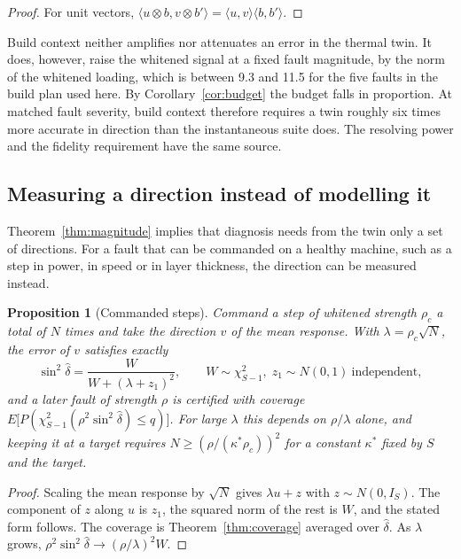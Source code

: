 \documentclass[preprint,12pt]{elsarticle}
\newtheorem{proposition}[theorem]{Proposition}
\begin{document}
\begin{proof}
For unit vectors,
$\langle u\otimes b, v\otimes b'\rangle = \langle u,v\rangle\langle b,b'\rangle$.
\end{proof}

Build context neither amplifies nor attenuates an error in the thermal twin.
It does, however, raise the whitened signal at a fixed fault magnitude, by the
norm of the whitened loading, which is between 9.3 and 11.5 for the five faults
in the build plan used here. By Corollary~\ref{cor:budget} the budget falls in
proportion. At matched fault severity, build context therefore requires a twin
roughly six times more accurate in direction than the instantaneous suite does.
The resolving power and the fidelity requirement have the same source.

\subsection{Measuring a direction instead of modelling it}

Theorem~\ref{thm:magnitude} implies that diagnosis needs from the twin only a
set of directions. For a fault that can be commanded on a healthy machine, such
as a step in power, in speed or in layer thickness, the direction can be
measured instead.

\begin{proposition}[Commanded steps]
\label{prop:commanded}
Command a step of whitened strength $\rho_c$ a total of $N$ times and take the
direction $v$ of the mean response. With $\lambda = \rho_c\sqrt{N}$, the error
of $v$ satisfies exactly
\begin{equation}
\sin^2\hat\delta = \frac{W}{W + (\lambda + z_1)^2},
\qquad W\sim\chi^2_{S-1},\; z_1 \sim N(0,1)\ \text{independent},
\end{equation}
and a later fault of strength $\rho$ is certified with coverage
$E\bigl[P(\chi^2_{S-1}(\rho^2\sin^2\hat\delta)\le q)\bigr]$. For large
$\lambda$ this depends on $\rho/\lambda$ alone, and keeping it at a target
requires $N \ge (\rho/(\kappa^*\rho_c))^2$ for a constant $\kappa^*$ fixed by
$S$ and the target.
\end{proposition}

\begin{proof}
Scaling the mean response by $\sqrt N$ gives $\lambda u + z$ with
$z \sim N(0, I_S)$. The component of $z$ along $u$ is $z_1$, the squared norm of
the rest is $W$, and the stated form follows. The coverage is
Theorem~\ref{thm:coverage} averaged over $\hat\delta$. As $\lambda$ grows,
$\rho^2\sin^2\hat\delta \to (\rho/\lambda)^2 W$.
\end{proof}
\end{document}

